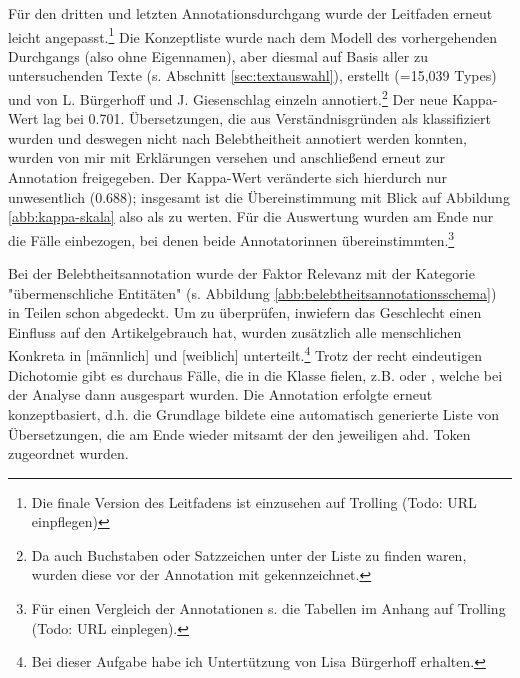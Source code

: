 Für den dritten und letzten Annotationsdurchgang wurde der Leitfaden erneut leicht angepasst.\footnote{Die finale Version des Leitfadens ist einzusehen auf Trolling (Todo: URL einpflegen)} Die Konzeptliste wurde nach dem Modell des vorhergehenden Durchgangs (also ohne Eigennamen), aber diesmal auf Basis aller zu untersuchenden Texte (s. Abschnitt \ref{sec:textauswahl}), erstellt (=15,039 Types) und von L. Bürgerhoff und J. Giesenschlag einzeln annotiert.\footnote{Da auch Buchstaben oder Satzzeichen unter der Liste zu finden waren, wurden diese vor der Annotation mit  gekennzeichnet.} Der neue Kappa-Wert lag bei 0.701. Übersetzungen, die aus Verständnisgründen als  klassifiziert wurden und deswegen nicht nach Belebtheitheit annotiert werden konnten, wurden von mir mit Erklärungen versehen und anschließend erneut zur Annotation freigegeben. Der Kappa-Wert veränderte sich hierdurch nur unwesentlich (0.688); insgesamt ist die Übereinstimmung mit Blick auf Abbildung \ref{abb:kappa-skala} also als   zu werten. Für die Auswertung wurden am Ende nur die Fälle einbezogen, bei denen beide Annotatorinnen übereinstimmten.\footnote{Für einen Vergleich der Annotationen s. die Tabellen im Anhang auf Trolling (Todo: URL einplegen).} 


Bei der Belebtheitsannotation wurde der Faktor Relevanz mit der Kategorie "übermenschliche Entitäten" (s. Abbildung \ref{abb:belebtheitsannotationsschema}) in Teilen schon abgedeckt. Um zu überprüfen, inwiefern das Geschlecht einen Einfluss auf den Artikelgebrauch hat, wurden zusätzlich alle menschlichen Konkreta in [männlich] und [weiblich] unterteilt.\footnote{Bei dieser Aufgabe habe ich Untertützung von Lisa Bürgerhoff erhalten.} 
Trotz der recht eindeutigen Dichotomie gibt es durchaus Fälle, die in die Klasse  fielen, z.B.  oder , welche bei der Analyse dann ausgespart wurden.  Die Annotation erfolgte erneut konzeptbasiert, d.h. die Grundlage bildete eine automatisch generierte Liste von Übersetzungen, die am Ende wieder mitsamt der  den jeweiligen ahd. Token zugeordnet wurden. 


